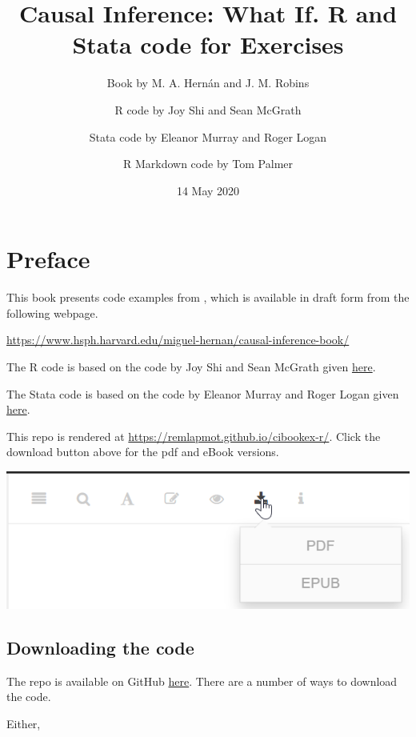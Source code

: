 \documentclass[
  10pt,
]{book}
\title{Causal Inference: What If. R and Stata code for Exercises}
\author{Book by M. A. Hernán and J. M. Robins \and R code by Joy Shi and Sean McGrath \and Stata code by Eleanor Murray and Roger Logan \and R Markdown code by Tom Palmer}
\date{14 May 2020}
\begin{document}
\maketitle

\thispagestyle{empty}

{
\setcounter{tocdepth}{1}
\tableofcontents
}
\hypertarget{preface}{%
\chapter*{Preface}\label{preface}}

This book presents code examples from \citet{ci-book}, which is available in draft form from the following webpage.

\url{https://www.hsph.harvard.edu/miguel-hernan/causal-inference-book/}

The R code is based on the code by Joy Shi and Sean McGrath given \href{https://cdn1.sph.harvard.edu/wp-content/uploads/sites/1268/1268/20/Rcode_CIpart2.zip}{here}.

The Stata code is based on the code by Eleanor Murray and Roger Logan given \href{https://cdn1.sph.harvard.edu/wp-content/uploads/sites/1268/2019/11/stata_part2.zip}{here}.

This repo is rendered at \url{https://remlapmot.github.io/cibookex-r/}. Click the download button above for the pdf and eBook versions.

\begin{center}\includegraphics[width=0.65\linewidth]{figs/download} \end{center}

\hypertarget{downloading-the-code}{%
\section{Downloading the code}\label{downloading-the-code}}

The repo is available on GitHub \href{https://github.com/remlapmot/cibookex-r}{here}. There are a number of ways to download the code.

Either,
\end{document}
